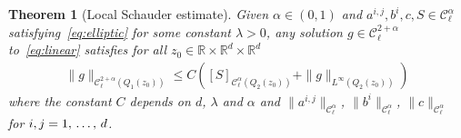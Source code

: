 \documentclass[10pt]{amsart}
\newtheorem{theo}{Theorem}[section]
\theoremstyle{definition}\newtheorem{defi}[theo]{Definition}\newtheorem{rema}[theo]{Remark}\newtheorem{exam}[theo]{Example}\newtheorem{exem}[theo]{Example}\newtheorem{nota}[theo]{Notation}
\newcommand{\R}{\mathbb{R}}
\newcommand{\cC}{\mathcal{C}}
\begin{document}
\begin{theo}[Local Schauder estimate]\label{thm:variable-loc}
Given $\alpha \in (0,1)$ and $a^{i,j},b^i,c, S \in\cC_\ell^{\alpha}$ satisfying~\eqref{eq:elliptic} for some constant $\lambda >0$, any solution $g \in \cC_\ell^{2+\alpha}$ to~\eqref{eq:linear} satisfies for all $z_0 \in \R \times \R^d \times \R^d$
\begin{align*}
\| g\|_{\cC_\ell^{2+\alpha}\left(Q_1(z_0)\right)}
\le C \left([S]_{\cC_\ell^{\alpha}\left(Q_2(z_0)\right)} + \| g
\|_{L^\infty\left(Q_2(z_0)\right)} \right)
\end{align*}
where the constant $C$ depends on $d$, $\lambda$ and $\alpha$ and $\|a^{i,j}\|_{\cC_\ell^{\alpha}}$, $\|b^i\|_{\cC_\ell^{\alpha}}$, $\|c\|_{\cC_\ell^{\alpha}}$ for $i,j\linebreak =1,\,\dots,\,d$.
\end{theo}
\end{document}
